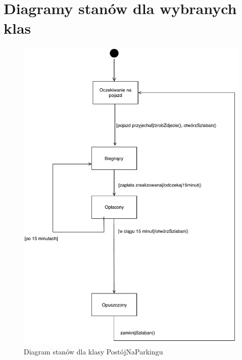 \section{Diagramy stanów dla wybranych klas}
\label{sec:diagStanow}
\begin{figure}[H]
	\centering
	\includegraphics[width=130mm]{diagramy/DiagStanPostoj.pdf}
	\caption{Diagram stanów dla klasy PostójNaParkingu \label{overflow}}
\end{figure}
